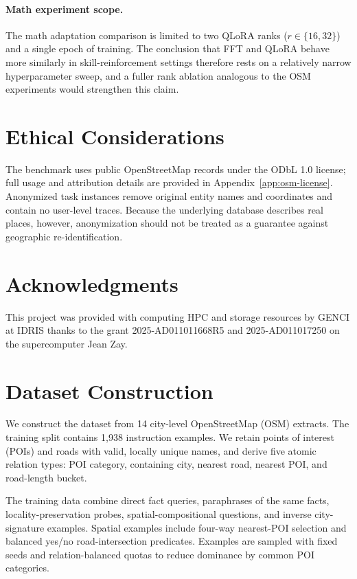 \documentclass[11pt]{article}
\begin{document}
\paragraph{Math experiment scope.}
The math adaptation comparison is limited to 
two QLoRA ranks ($r \in \{16, 32\}$) and a single epoch of training. 
The conclusion that FFT and QLoRA behave more similarly 
in skill-reinforcement settings therefore rests on a relatively narrow 
hyperparameter sweep, and a fuller rank ablation analogous to 
the OSM experiments would strengthen this claim.

\section*{Ethical Considerations}
The benchmark uses public OpenStreetMap records under the ODbL 1.0 license; full
usage and attribution details are provided in Appendix~\ref{app:osm-license}.
Anonymized task instances remove original entity names and coordinates and
contain no user-level traces. Because the underlying database describes real
places, however, anonymization should not be treated as a guarantee against
geographic re-identification.

\section*{Acknowledgments}
This project was provided with computing HPC and storage resources by GENCI 
at IDRIS thanks to the grant 2025-AD011011668R5 and 2025-AD011017250
on the supercomputer Jean Zay.

%


\clearpage

\appendix

\section{Dataset Construction}
\label{sec:dataset}
We construct the dataset from 14 city-level OpenStreetMap (OSM) extracts. The
training split contains 1,938 instruction examples.
We retain points of interest (POIs) and roads with valid, locally unique names,
and derive five atomic relation types: 
POI category, containing city, nearest road, nearest POI, and road-length bucket.

The training data combine direct fact queries, paraphrases of the same facts,
locality-preservation probes, spatial-compositional questions, and inverse city-
signature examples. Spatial examples include four-way nearest-POI selection and
balanced yes/no road-intersection predicates. Examples are sampled with fixed seeds
and relation-balanced quotas to reduce dominance by common POI categories.
\end{document}
